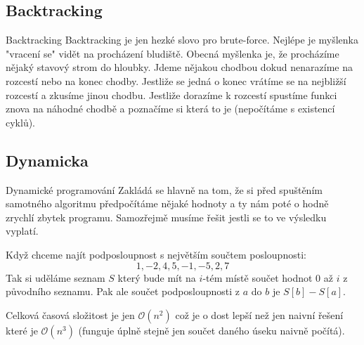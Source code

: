 \documentclass{beamer}
\newcommand{\bigO}{\mathcal{O}}
\begin{document}
\subsection{Backtracking}
\label{ssec:backtracking}


\begin{frame}{Backtracking}
 Backtracking je jen hezké slovo pro brute-force. Nejlépe je myšlenka "vracení
 se" vidět na procházení bludiště. Obecná myšlenka je, že procházíme nějaký
 stavový strom do hloubky.
\vfill
 Jdeme nějakou chodbou dokud nenarazíme na rozcestí nebo na konec chodby.
 Jestliže se jedná o konec vrátíme se na nejbližší rozcestí a zkusíme jinou
 chodbu. Jestliže dorazíme k rozcestí spustíme funkci znova na náhodné chodbě a
 poznačíme si která to je (nepočítáme s existencí cyklů).


\end{frame}
\subsection{Dynamicka}
\label{ssec:dynamicka}


\begin{frame}{Dynamické programování}
 Zakládá se hlavně na tom, že si před spuštěním samotného algoritmu předpočítáme
 nějaké hodnoty a ty nám poté o hodně zrychlí zbytek programu. Samozřejmě musíme
 řešit jestli se to ve výsledku vyplatí.

 Když chceme najít podposloupnost s největším součtem posloupnosti:
 \[
  1,-2,4,5,-1,-5,2,7
 \]
Tak si uděláme seznam $S$ který bude mít na $i$-tém místě součet hodnot 0 až $i$
z původního seznamu. Pak ale součet podposloupnosti z $a$ do $b$ je $S[b]-S[a]$.
\vfill

Celková časová složitost je jen $\bigO(n^2)$ což je o dost lepší než jen naivní
řešení které je $\bigO(n^3)$ (funguje úplně stejně jen součet daného úseku
naivně počítá).
 
\end{frame}
\end{document}
